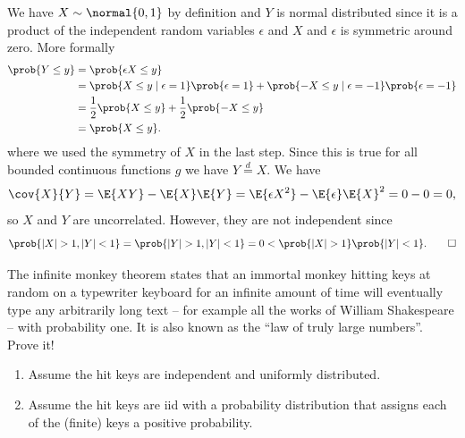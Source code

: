 \documentclass[11pt]{article}
\begin{document}
\begin{solution}
    We have \(X \sim \normal{0,1}\) by definition and \(Y\) is normal
    distributed since it is a product of the independent random variables
    \(\epsilon\) and \(X\) and \(\epsilon\) is
    symmetric around zero. More formally
    \[\begin{aligned}
        \prob{Y \le y}
        &= \prob{\epsilon X \le y}
        \\
        &= \prob{X \le y \mid \epsilon = 1} \prob{\epsilon = 1} + \prob{-X \le y \mid \epsilon = -1} \prob{\epsilon = -1}
        \\
        &= \frac{1}{2} \prob{X \le y} + \frac{1}{2} \prob{-X \le y} 
        \\
        &= \prob{X \le y}.
    \end{aligned}\]
    where we used the symmetry of \(X\) in the last step. Since this is true for all bounded continuous functions \(g\) we have \(Y \overset{d}= X\).
    We have
    \[
        \cov{X}{Y}
        = \E{XY} - \E{X}\E{Y}
        = \E{\epsilon X^2} - \E{\epsilon}\E{X}^2
        = 0 - 0 = 0,
    \]
    so \(X\) and \(Y\) are uncorrelated.
    However, they are not independent since
    \[
        \prob{\abs{X} > 1, \abs{Y} < 1}
        = \prob{\abs{Y} >1, \abs{Y} < 1} = 0
        < \prob{\abs{X} > 1}\prob{\abs{Y} < 1}.
        \qedhere
    \]
\end{solution}



\begin{exercise}[subtitle={Infinite Monkey Theorem}]
    The infinite monkey theorem states that an immortal monkey hitting keys at
    random on a typewriter keyboard for an infinite amount of time will
    eventually type any arbitrarily long text -- for example all the
    works of William Shakespeare -- with probability one.  It is also known as
    the ``law of truly large numbers''.
    Prove it!
    \begin{enumerate}[label={\emph{Level \arabic*:}},ref={Level \arabic*},leftmargin=4em,noitemsep]
        \item Assume the hit keys are independent and uniformly distributed.
        \item\label{it: level iid} Assume the hit keys are iid with a probability distribution that
        assigns each of the (finite) keys a positive probability.
    \end{enumerate}
\end{exercise}
\end{document}
